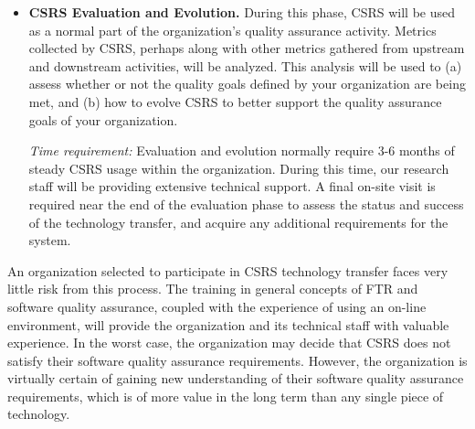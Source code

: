 \begin{itemize}
  {\em Time requirement:} CSRS installation and training typically requires 1
  day of on-site setup followed by 2-3 days of on-site lecturing and
  group use.
  
\item {\bf CSRS Evaluation and Evolution.} During this phase, CSRS will
  be used as a normal part of the organization's quality assurance
  activity.  Metrics collected by CSRS, perhaps along with other metrics
  gathered from upstream and downstream activities, will be analyzed.  This
  analysis will be used to (a) assess whether or not the quality goals
  defined by your organization are being met, and (b) how to evolve CSRS to
  better support the quality assurance goals of your organization.
  
  {\em Time requirement:} Evaluation and evolution normally require 3-6 months
  of steady CSRS usage within the organization.  During this time, our
  research staff will be providing extensive technical support.  A final
  on-site visit is required near the end of the evaluation phase to
  assess the status and success of the technology transfer, and acquire
  any additional requirements for the system.
  
\end{itemize}

An organization selected to participate in CSRS technology transfer faces
very little risk from this process. The training in general concepts of FTR
and software quality assurance, coupled with the experience of using an
on-line environment, will provide the organization and its technical staff
with valuable experience.  In the worst case, the organization may decide
that CSRS does not satisfy their software quality assurance requirements.
However, the organization is virtually certain of gaining new understanding
of their software quality assurance requirements, which is of more value in
the long term than any single piece of technology.












